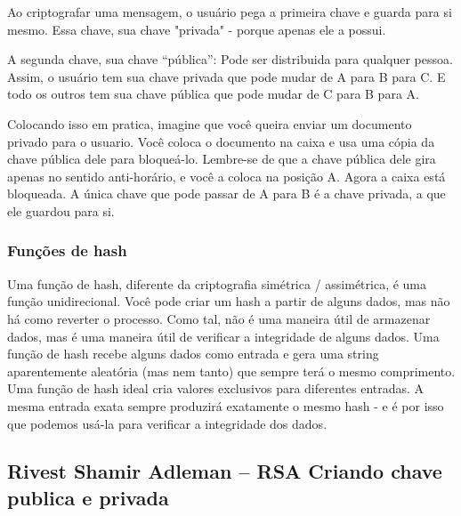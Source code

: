 Ao criptografar uma mensagem, o usuário pega a primeira chave e guarda para si mesmo. Essa chave, sua chave "privada" - porque apenas ele a possui.

A segunda chave, sua chave “pública”: Pode ser distribuida para qualquer pessoa. Assim, o usuário tem sua chave privada que pode mudar de A para B para C. E todo os outros tem sua chave pública que pode mudar de C para B para A.

Colocando isso em pratica, imagine que você queira enviar um documento privado para o usuario. Você coloca o documento na caixa e usa uma cópia da chave pública dele para bloqueá-lo. Lembre-se de que a chave pública dele gira apenas no sentido anti-horário, e você a coloca na posição A. Agora a caixa está bloqueada. A única chave que pode passar de A para B é a chave privada, a que ele guardou para si.

\subsubsection{Funções de hash}
Uma função de hash, diferente da criptografia simétrica / assimétrica, é uma função unidirecional. Você pode criar um hash a partir de alguns dados, mas não há como reverter o processo. Como tal, não é uma maneira útil de armazenar dados, mas é uma maneira útil de verificar a integridade de alguns dados.
Uma função de hash recebe alguns dados como entrada e gera uma string aparentemente aleatória (mas nem tanto) que sempre terá o mesmo comprimento. Uma função de hash ideal cria valores exclusivos para diferentes entradas. A mesma entrada exata sempre produzirá exatamente o mesmo hash - e é por isso que podemos usá-la para verificar a integridade dos dados.

\subsection{Rivest Shamir Adleman – RSA Criando chave publica e privada}

